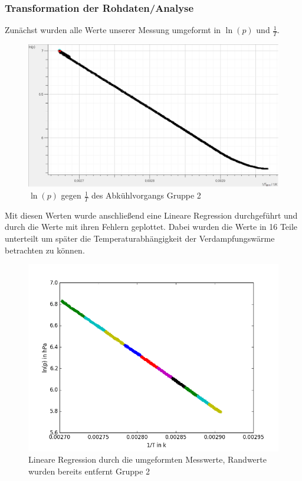 \documentclass[12pt,a4paper]{article}
\begin{document}
\subsubsection{Transformation der Rohdaten/Analyse}
Zunächst wurden alle Werte unserer Messung umgeformt in $\ln(p)$ und $\frac{1}{T}$.
\begin{figure}[H]
\centering
\includegraphics[scale=0.5]{Bilder/HauptmessungbearbeitetGrp2.png}
\caption{$\ln(p)$ gegen $\frac{1}{T}$ des Abkühlvorgangs Gruppe 2}
\end{figure}
Mit diesen Werten wurde anschließend eine Lineare Regression durchgeführt und durch die Werte mit ihren Fehlern geplottet. Dabei wurden die Werte in 16 Teile unterteilt um später die Temperaturabhängigkeit der Verdampfungswärme betrachten zu können.
\begin{figure}[H]
\centering
\includegraphics[scale=0.7]{Bilder/linreg_EL_neuerFehler.png}
\caption{Lineare Regression durch die umgeformten Messwerte, Randwerte wurden bereits entfernt Gruppe 2}
\end{figure}
\end{document}
